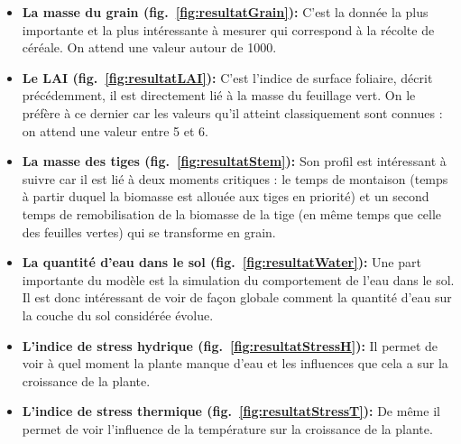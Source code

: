 \begin{itemize}

	\item \textbf{La masse du grain (fig.~\ref{fig:resultatGrain}):} C'est la donnée la plus importante et la plus intéressante à mesurer qui correspond à la récolte de céréale. On attend une valeur autour de 1000.
	
	\item \textbf{Le LAI (fig.~\ref{fig:resultatLAI}):} C'est l'indice de surface foliaire, décrit précédemment, il est directement lié à la masse du feuillage vert. On le préfère à ce dernier car les valeurs qu'il atteint classiquement sont connues : on attend une valeur entre 5 et 6.
	
	\item \textbf{La masse des tiges (fig.~\ref{fig:resultatStem}):} Son profil est intéressant à suivre car il est lié à deux moments critiques : le temps de montaison (temps à partir duquel la biomasse est allouée aux tiges en priorité) et un second temps de remobilisation de la biomasse de la tige (en même temps que celle des feuilles vertes) qui se transforme en grain.
	
	\item \textbf{La quantité d'eau dans le sol (fig.~\ref{fig:resultatWater}):} Une part importante du modèle est la simulation du comportement de l'eau dans le sol. Il est donc intéressant de voir de façon globale comment la quantité d'eau sur la couche du sol considérée évolue.
	
	\item \textbf{L'indice de stress hydrique (fig.~\ref{fig:resultatStressH}):} Il permet de voir à quel moment la plante manque d'eau et les influences que cela a sur la croissance de la plante.
	
	\item \textbf{L'indice de stress thermique (fig.~\ref{fig:resultatStressT}):} De même il permet de voir l'influence de la température sur la croissance de la plante.

\end{itemize}


